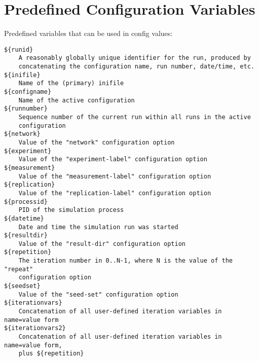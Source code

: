 \section{Predefined Configuration Variables}

Predefined variables that can be used in config values:

\begin{verbatim}
${runid}
    A reasonably globally unique identifier for the run, produced by
    concatenating the configuration name, run number, date/time, etc.
${inifile}
    Name of the (primary) inifile
${configname}
    Name of the active configuration
${runnumber}
    Sequence number of the current run within all runs in the active
    configuration
${network}
    Value of the "network" configuration option
${experiment}
    Value of the "experiment-label" configuration option
${measurement}
    Value of the "measurement-label" configuration option
${replication}
    Value of the "replication-label" configuration option
${processid}
    PID of the simulation process
${datetime}
    Date and time the simulation run was started
${resultdir}
    Value of the "result-dir" configuration option
${repetition}
    The iteration number in 0..N-1, where N is the value of the "repeat"
    configuration option
${seedset}
    Value of the "seed-set" configuration option
${iterationvars}
    Concatenation of all user-defined iteration variables in name=value form
${iterationvars2}
    Concatenation of all user-defined iteration variables in name=value form,
    plus ${repetition}
\end{verbatim}

